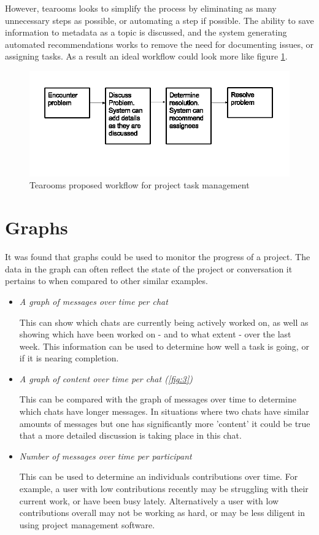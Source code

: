 \documentclass{l4proj}
\begin{document}
However, tearooms looks to simplify the process by eliminating as many unnecessary steps as possible, or automating a step if possible. The ability to save information to metadata as a topic is discussed, and the system generating automated recommendations works to remove the need for documenting issues, or assigning tasks.  As a result an ideal workflow could look more like figure \ref{fig:2}. 

\begin{figure}[h]
\includegraphics[scale=0.75]{New-workflow.png}
\centering
\caption{Tearooms proposed workflow for project task management}
\label{fig:2}
\end{figure}

\section{Graphs}

It was found that graphs could be used to monitor the progress of a project. The data in the graph can often reflect the state of the project or conversation it pertains to when compared to other similar examples.

\begin{itemize}
\item \textit{A graph of messages over time per chat}
\par This can show which chats are currently being actively worked on, as well as showing which have been worked on - and to what extent - over the last week.  This information can be used to determine how well a task is going, or if it is nearing completion.
\item \textit{A graph of content over time per chat (\ref{fig:3})}
\par This can be compared with the graph of messages over time to determine which chats have longer messages.  In situations where two chats have similar amounts of messages but one has significantly more 'content' it could be true that a more detailed discussion is taking place in this chat.
\item \textit{Number of messages over time per participant}
\par This can be used to determine an individuals contributions over time.  For example, a user with low contributions recently may be struggling with their current work, or have been busy lately. Alternatively a user with low contributions overall may not be working as hard, or may be less diligent in using project management software.

\end{itemize}
\end{document}
